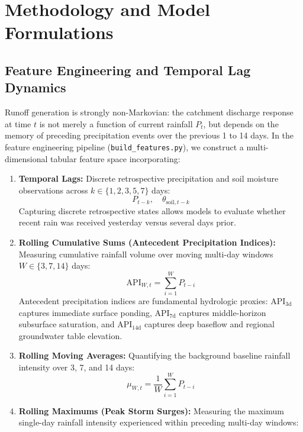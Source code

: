 \documentclass[journal]{IEEEtran}
\begin{document}
\section{Methodology and Model Formulations}

\subsection{Feature Engineering and Temporal Lag Dynamics}
Runoff generation is strongly non-Markovian: the catchment discharge response at time $t$ is not merely a function of current rainfall $P_t$, but depends on the memory of preceding precipitation events over the previous 1 to 14 days. In the feature engineering pipeline (\texttt{build\_features.py}), we construct a multi-dimensional tabular feature space incorporating:
\begin{enumerate}
    \item \textbf{Temporal Lags:} Discrete retrospective precipitation and soil moisture observations across $k \in \{1, 2, 3, 5, 7\}$ days:
    \begin{equation}
    P_{t-k}, \quad \theta_{\text{soil}, t-k}
    \end{equation}
    Capturing discrete retrospective states allows models to evaluate whether recent rain was received yesterday versus several days prior.
    \item \textbf{Rolling Cumulative Sums (Antecedent Precipitation Indices):} Measuring cumulative rainfall volume over moving multi-day windows $W \in \{3, 7, 14\}$ days:
    \begin{equation}
    \text{API}_{W, t} = \sum_{i=1}^{W} P_{t-i}
    \end{equation}
    Antecedent precipitation indices are fundamental hydrologic proxies: $\text{API}_{3\text{d}}$ captures immediate surface ponding, $\text{API}_{7\text{d}}$ captures middle-horizon subsurface saturation, and $\text{API}_{14\text{d}}$ captures deep baseflow and regional groundwater table elevation.
    \item \textbf{Rolling Moving Averages:} Quantifying the background baseline rainfall intensity over 3, 7, and 14 days:
    \begin{equation}
    \mu_{W, t} = \frac{1}{W} \sum_{i=1}^{W} P_{t-i}
    \end{equation}
    \item \textbf{Rolling Maximums (Peak Storm Surges):} Measuring the maximum single-day rainfall intensity experienced within preceding multi-day windows:
    \begin{equation}

\end{equation}
\end{enumerate}
\end{document}

